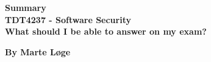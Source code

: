 \begin{titlepage}
\begin{center}

{\Huge \bf Summary} \\[1.0cm]
{\Huge \bf TDT4237 - Software Security}\\[4.0cm]

{\Huge \bf What should I be able to answer on my exam?} \\

\vspace{12cm}

\centering
{\Large \bf By Marte Løge}



\end{center}
\end{titlepage}